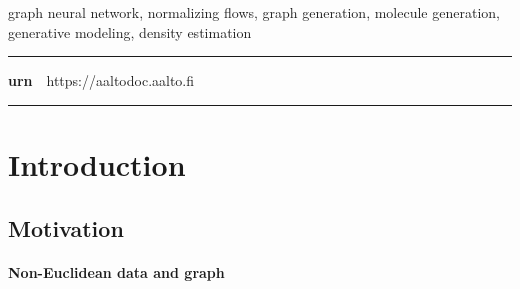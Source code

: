 \begin{spacing}{.88}
	{\parindent0pt %

  \parbox[t]{123.6mm}{\raggedright\small graph neural network,
  normalizing flows, graph generation, molecule generation, generative modeling, density estimation}

	\vspace{.5mm}\rule{\textwidth}{.75pt}

	{\fontsize{10.5pt}{10.5pt}\bfseries\sffamily\lsstyle urn}~~{\small https://aaltodoc.aalto.fi}

	\vspace{-2.4mm}\rule{\textwidth}{.75pt}

	} %
\end{spacing}




\newpage

\tableofcontents


\newpage


\chapter{Introduction}

\section{Motivation}

\subsubsection{Non-Euclidean data and graph}

